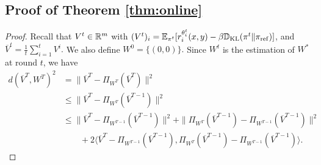 \subsection{Proof of Theorem \ref{thm:online}}
\begin{proof}
Recall that $V^t \in \mathbb{R}^m$ with $(V^t)_i = \mathbb{E}_{\pi^t}[r_i^{\theta_i^t}(x,y) - \beta \mathbb{D}_{\mathrm{KL}}(\pi^t \|\pi_{\mathrm{ref}})]$, and $\overline{V}^t = \frac{1}{t}\sum_{i=1}^t V^i.$ We also define $W^0 = \{(0,0)\}.$ Since $W^t$ is the estimation of $W^*$ at round $t$, we have 
\begin{align}
    d(\overline{V}^T, W^T)^2 &= \|\overline{V}^T - \Pi_{W^T}(\overline{V}^T)\|^2\nonumber\\
    &\le \|\overline{V}^T - \Pi_{W^T}(\overline{V}^{T-1})\|^2\nonumber\\
    &\le \|\overline{V}^T - \Pi_{W^{T-1}}(\overline{V}^{T-1})\|^2 + \|\Pi_{W^T}(\overline{V}^{T-1}) - \Pi_{W^{T-1}}(\overline{V}^{T-1})\|^2\nonumber \\&\qquad + 2\langle \overline{V}^T - \Pi_{W^{T-1}}(\overline{V}^{T-1}), \Pi_{W^T}(\overline{V}^{T-1}) - \Pi_{W^{T-1}}(\overline{V}^{T-1})\rangle.\label{ineq:first}
\end{align}

\end{proof}
